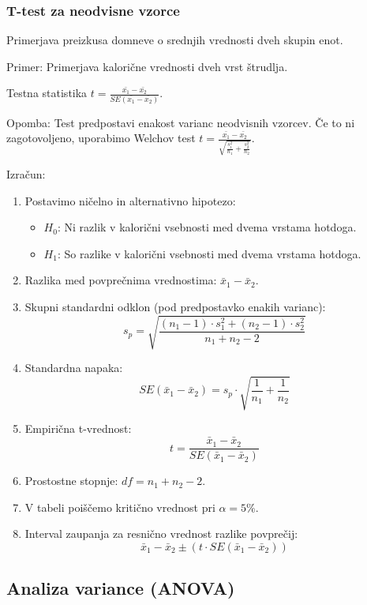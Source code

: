\subsubsection*{T-test za neodvisne vzorce}

Primerjava preizkusa domneve o srednjih vrednosti dveh skupin enot.

Primer: Primerjava kalorične vrednosti dveh vrst štrudlja.

Testna statistika $t = \frac{\bar{x_1}-\bar{x_2}}{SE(\bar{x_1}-\bar{x_2})}$.

Opomba: Test predpostavi enakost varianc neodvisnih vzorcev. Če to ni zagotovoljeno, uporabimo Welchov test $t = \frac{\bar{x_1}-\bar{x_2}}{\sqrt{\frac{s_1^2}{n_1}+\frac{s_2^2}{n_2}}}$.

Izračun:
\begin{enumerate}
    \item Postavimo ničelno in alternativno hipotezo:
        \begin{itemize}
            \item $H_0$: Ni razlik v kalorični vsebnosti med dvema vrstama hotdoga.
            \item $H_1$: So razlike v kalorični vsebnosti med dvema vrstama hotdoga.
        \end{itemize}
    \item Razlika med povprečnima vrednostima: $\bar{x}_1 - \bar{x}_2$.
    \item Skupni standardni odklon (pod predpostavko enakih varianc):
        \[s_p = \sqrt{\frac{(n_1 - 1) \cdot s_1^2 + (n_2 - 1) \cdot s_2^2}{n_1 + n_2 - 2}}\]
    \item Standardna napaka: 
        \[SE(\bar{x}_1 - \bar{x}_2) = s_p \cdot \sqrt{\frac{1}{n_1} + \frac{1}{n_2}}\]
    \item Empirična t-vrednost: 
        \[t = \frac{\bar{x}_1 - \bar{x}_2}{SE(\bar{x}_1 - \bar{x}_2)}\]
    \item Prostostne stopnje: $df = n_1 + n_2 - 2$.
    \item V tabeli poiščemo kritično vrednost pri $\alpha = 5\%$.
    \item Interval zaupanja za resnično vrednost razlike povprečij: 
        \[\bar{x}_1 - \bar{x}_2 \pm (t \cdot SE(\bar{x}_1 - \bar{x}_2))\]
\end{enumerate}

\subsection*{Analiza variance (ANOVA)}

